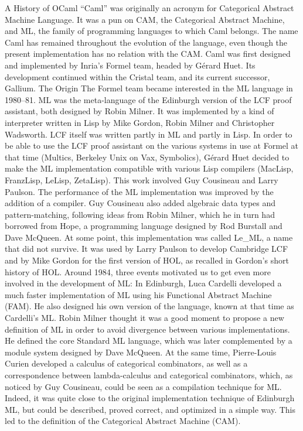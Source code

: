 \documentclass[14pt]{matmex-diploma-custom}
\begin{document}
A History of OCaml
“Caml” was originally an acronym for Categorical Abstract Machine Language. It was a pun on CAM, the Categorical Abstract Machine, and ML, the family of programming languages to which Caml belongs. The name Caml has remained throughout the evolution of the language, even though the present implementation has no relation with the CAM.
Caml was first designed and implemented by Inria's Formel team, headed by Gérard Huet. Its development continued within the Cristal team, and its current successor, Gallium.
The Origin
The Formel team became interested in the ML language in 1980–81. ML was the meta-language of the Edinburgh version of the LCF proof assistant, both designed by Robin Milner. It was implemented by a kind of interpreter written in Lisp by Mike Gordon, Robin Milner and Christopher Wadsworth. LCF itself was written partly in ML and partly in Lisp. In order to be able to use the LCF proof assistant on the various systems in use at Formel at that time (Multics, Berkeley Unix on Vax, Symbolics), Gérard Huet decided to make the ML implementation compatible with various Lisp compilers (MacLisp, FranzLisp, LeLisp, ZetaLisp). This work involved Guy Cousineau and Larry Paulson. The performance of the ML implementation was improved by the addition of a compiler.
Guy Cousineau also added algebraic data types and pattern-matching, following ideas from Robin Milner, which he in turn had borrowed from Hope, a programming language designed by Rod Burstall and Dave McQueen. At some point, this implementation was called Le\_ML, a name that did not survive. It was used by Larry Paulson to develop Cambridge LCF and by Mike Gordon for the first version of HOL, as recalled in Gordon's short history of HOL.
Around 1984, three events motivated us to get even more involved in the development of ML:
In Edinburgh, Luca Cardelli developed a much faster implementation of ML using his Functional Abstract Machine (FAM). He also designed his own version of the language, known at that time as Cardelli's ML.
Robin Milner thought it was a good moment to propose a new definition of ML in order to avoid divergence between various implementations. He defined the core Standard ML language, which was later complemented by a module system designed by Dave McQueen.
At the same time, Pierre-Louis Curien developed a calculus of categorical combinators, as well as a correspondence between lambda-calculus and categorical combinators, which, as noticed by Guy Cousineau, could be seen as a compilation technique for ML. Indeed, it was quite close to the original implementation technique of Edinburgh ML, but could be described, proved correct, and optimized in a simple way. This led to the definition of the Categorical Abstract Machine (CAM).
\end{document}

